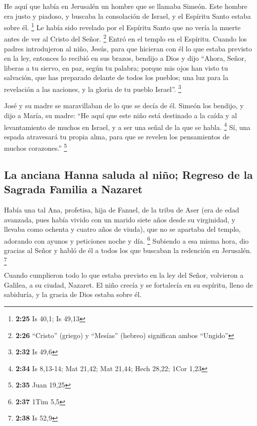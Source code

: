\begin{paracol}{2}
 He aquí que había en Jerusalén un hombre que se llamaba
Simeón. Este hombre era justo y piadoso, y buscaba la consolación de
Israel, y el Espíritu Santo estaba sobre él. \footnote{\textbf{2:25} Is
  40,1; Is 49,13}  Le había sido revelado por el Espíritu
Santo que no vería la muerte antes de ver al Cristo del Señor.
\footnote{\textbf{2:26} ``Cristo'' (griego) y ``Mesías'' (hebreo)
  significan ambos ``Ungido''}  Entró en el templo en el
Espíritu. Cuando los padres introdujeron al niño, Jesús, para que
hicieran con él lo que estaba previsto en la ley, 
entonces lo recibió en sus brazos, bendijo a Dios y dijo 
``Ahora, Señor, liberas a tu siervo, en paz, según tu palabra;
 porque mis ojos han visto tu salvación, 
que has preparado delante de todos los pueblos;  una luz
para la revelación a las naciones, y la gloria de tu pueblo Israel''.
\footnote{\textbf{2:32} Is 49,6}

 José y su madre se maravillaban de lo que se decía de
él.  Simeón los bendijo, y dijo a María, su madre: ``He
aquí que este niño está destinado a la caída y al levantamiento de
muchos en Israel, y a ser una señal de la que se habla. \footnote{\textbf{2:34}
  Is 8,13-14; Mat 21,42; Mat 21,44; Hech 28,22; 1Cor 1,23}
 Sí, una espada atravesará tu propia alma, para que se
revelen los pensamientos de muchos corazones.'' \footnote{\textbf{2:35}
  Juan 19,25}

\hypertarget{la-anciana-hanna-saluda-al-niuxf1o-regreso-de-la-sagrada-familia-a-nazaret}{%
\subsection{La anciana Hanna saluda al niño; Regreso de la Sagrada
Familia a
Nazaret}\label{la-anciana-hanna-saluda-al-niuxf1o-regreso-de-la-sagrada-familia-a-nazaret}}

 Había una tal Ana, profetisa, hija de Fanuel, de la
tribu de Aser (era de edad avanzada, pues había vivido con un marido
siete años desde su virginidad,  y llevaba como ochenta y
cuatro años de viuda), que no se apartaba del templo, adorando con
ayunos y peticiones noche y día. \footnote{\textbf{2:37} 1Tim 5,5}
 Subiendo a esa misma hora, dio gracias al Señor y habló
de él a todos los que buscaban la redención en Jerusalén. \footnote{\textbf{2:38}
  Is 52,9}

 Cuando cumplieron todo lo que estaba previsto en la ley
del Señor, volvieron a Galilea, a su ciudad, Nazaret.  El
niño crecía y se fortalecía en su espíritu, lleno de sabiduría, y la
gracia de Dios estaba sobre él.


\end{paracol}
